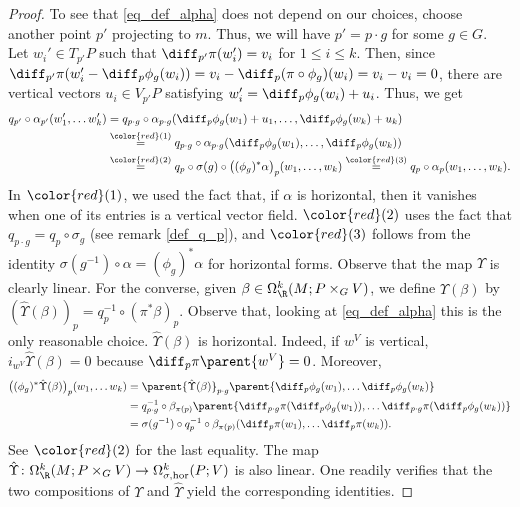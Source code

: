 \begin{proof}
    To see that \eqref{eq_def_alpha} does not depend on our choices, choose another point \(p'\) projecting to \(m\). Thus, we will have \(p'=p\cdot g\) for some \(g \in G\). Let \(w_i'\in T_{p'}P\) such that \(\diff_{p'}\pi(w_i')=v_i\) for \(1 \leq i \leq k\). Then, since \(\diff_{p'}\pi(w_i'-\diff_p\phi_g(w_i))=v_i-\diff_p(\pi \circ \phi_g)(w_i)=v_i-v_i=0\), there are vertical vectors \(u_i \in V_{p'}P\) satisfying \(w_i'=\diff_p\phi_g(w_i)+u_i\). Thus, we get
    \begin{align*}
        q_{p'} \circ {\alpha}_{p'}(w_1', \dots w_k') & = q_{p\cdot g}\circ {\alpha}_{p\cdot g}(\diff_p\phi_g(w_1)+u_1, \ldots, \diff_p\phi_g(w_k)+u_k) \\
        & \overset{{\color{red}(1)}}{=} q_{p\cdot g}\circ {\alpha}_{p\cdot g}(\diff_p\phi_g(w_1), \ldots, \diff_p\phi_g(w_k)) \\
        & \overset{{\color{red}(2)}}{=} q_p \circ \sigma(g) \circ \big((\phi_g)^* {\alpha}\big)_p (w_1, \ldots , w_k) \overset{{\color{red}(3)}}{=} q_p \circ \alpha_{p}(w_1, \ldots , w_k). 
    \end{align*}
    In \({\color{red}(1)}\), we used the fact that, if \({\alpha}\) is horizontal, then it vanishes when one of its entries is a vertical vector field. \({\color{red}(2)}\) uses the fact that \(q_{p\cdot g}=q_p \circ \sigma_g\) (see remark \ref{def_q_p}), and \({\color{red}(3)}\) follows from the identity \(\sigma(g^{-1}) \circ \alpha = (\phi_g)^*\alpha\) for horizontal forms. Observe that the map \(\Upsilon\) is clearly linear. For the converse, given \(\beta \in \Omega_\R^k(M;P\times_GV)\), we define \(\hat{\Upsilon}(\beta)\) by \( (\hat{\Upsilon}(\beta))_p=q_p^{-1}\circ (\pi^*\beta)_p.\) Observe that, looking at \eqref{eq_def_alpha} this is the only reasonable choice. \(\hat{\Upsilon}(\beta)\) is horizontal. Indeed, if \(w^V\) is vertical, \(i_{w^V}\hat{\Upsilon}(\beta)=0\) because \(\diff_p\pi\parent{w^V}=0\). Moreover,
    \begin{align*}
        \big((\phi_g)^*\hat{\Upsilon}(\beta)\big)_p(w_1, \ldots w_k) & = \parent{\hat{\Upsilon}(\beta)}_{p\cdot g}\parent{\diff_p\phi_g(w_1), \ldots \diff_p\phi_g(w_k)}\\
        &=q_{p\cdot g}^{-1}\circ \beta_{\pi(p)}\parent{\diff_{p\cdot g}\pi(\diff_p\phi_g(w_1)), \ldots \diff_{p\cdot g}\pi(\diff_p\phi_g(w_k))} \\
        & = \sigma(g^{-1})\circ q_p^{-1}\circ \beta_{\pi(p)} (\diff_p\pi(w_1), \ldots \diff_p\pi(w_k)).
    \end{align*}
    See \({\color{red}(2)}\) for the last equality. The map \(\hat{\Upsilon}\colon \Omega_\R^k(M;P \times_G V)\to \Omega_{\sigma, \mathrm{hor}}^k(P;V)\) is also linear. One readily verifies that the two compositions of \(\Upsilon\) and \(\hat{\Upsilon}\) yield the corresponding identities.
 \end{proof}

